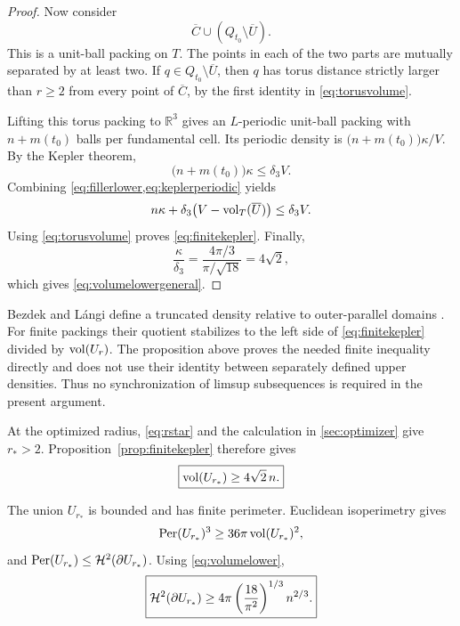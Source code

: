 \begin{proof}
Now consider
\[
 \overline C\cup(Q_{t_0}\setminus\overline U).
\]
This is a unit-ball packing on $T$.  The points in each of the two parts are
mutually separated by at least two.  If $q\in Q_{t_0}\setminus\overline U$, then
$q$ has torus distance strictly larger than $r\ge2$ from every point of
$\overline C$, by the first identity in \cref{eq:torusvolume}.

Lifting this torus packing to $\mathbb R^3$ gives an $L$-periodic unit-ball
packing with $n+m(t_0)$ balls per fundamental cell.  Its periodic density is
$\bigl(n+m(t_0)\bigr)\kappa/V$.  By the Kepler theorem,
\begin{equation}\label{eq:keplerperiodic}
 \bigl(n+m(t_0)\bigr)\kappa\le\delta_3V.
\end{equation}
Combining \cref{eq:fillerlower,eq:keplerperiodic} yields
\[
 n\kappa+\delta_3\bigl(V-\operatorname{vol}_T(\overline U)\bigr)
 \le\delta_3V.
\]
Using \cref{eq:torusvolume} proves \cref{eq:finitekepler}.  Finally,
\[
 \frac{\kappa}{\delta_3}
 =\frac{4\pi/3}{\pi/\sqrt{18}}
 =4\sqrt2,
\]
which gives \cref{eq:volumelowergeneral}.
\end{proof}

\begin{remark}\label{rem:truncateddensity}
Bezdek and L\'angi define a truncated density relative to outer-parallel domains
\cite{BezdekLangi2025}.  For finite packings their quotient stabilizes to the
left side of \cref{eq:finitekepler} divided by $\operatorname{vol}(U_r)$.  The proposition
above proves the needed finite inequality directly and does not use their
identity between separately defined upper densities.  Thus no synchronization
of limsup subsequences is required in the present argument.
\end{remark}

At the optimized radius, \cref{eq:rstar} and the calculation in
\cref{sec:optimizer} give $r_*>2$.  Proposition~\ref{prop:finitekepler} therefore
gives
\begin{equation}\label{eq:volumelower}
 \boxed{\operatorname{vol}(U_{r_*})\ge4\sqrt2\,n.}
\end{equation}

The union $U_{r_*}$ is bounded and has finite perimeter.  Euclidean
isoperimetry gives
\[
 \operatorname{Per}(U_{r_*})^3\ge36\pi\operatorname{vol}(U_{r_*})^2,
\]
and $\operatorname{Per}(U_{r_*})\le\mathcal H^2(\partial U_{r_*})$.  Using
\cref{eq:volumelower},
\begin{equation}\label{eq:surfacelower}
 \boxed{
 \mathcal H^2(\partial U_{r_*})
 \ge4\pi\left(\frac{18}{\pi^2}\right)^{1/3}n^{2/3}.}
\end{equation}

